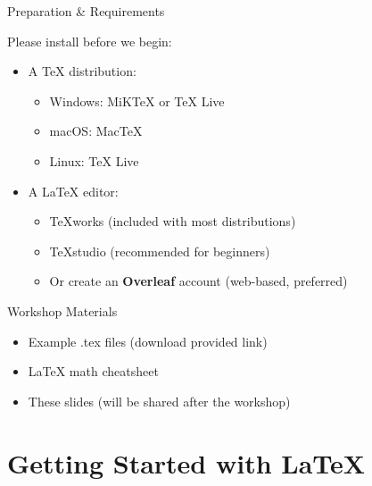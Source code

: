 \documentclass[ 9pt]{beamer}
\begin{document}
    \begin{frame}{Preparation \& Requirements}
        \begin{block}{Please install before we begin:}
            \begin{itemize}
                \item A TeX distribution:
                \begin{itemize}
                    \item Windows: MiKTeX or TeX Live
                    \item macOS: MacTeX
                    \item Linux: TeX Live
                \end{itemize}
                \item A LaTeX editor:
                \begin{itemize}
                    \item TeXworks (included with most distributions)
                    \item TeXstudio (recommended for beginners)
                    \item Or create an \textbf{Overleaf} account (web-based, preferred)
                \end{itemize}
            \end{itemize}
        \end{block}
        
        \begin{alertblock}{Workshop Materials}
            \begin{itemize}
                \item Example .tex files (download provided link)
                \item LaTeX math cheatsheet
                \item These slides (will be shared after the workshop)
            \end{itemize}
        \end{alertblock}
    \end{frame}
    
    \section{Getting Started with LaTeX}
    
\end{document}
